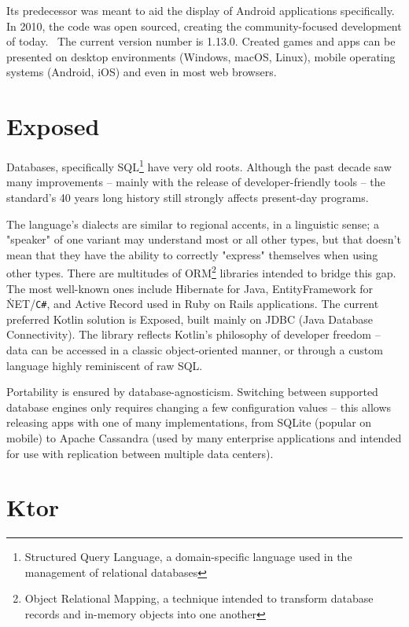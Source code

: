 Its predecessor was meant to aid the display of Android applications specifically. In 2010, the code was open sourced, creating the community-focused development of today.~\cite{LibgdxHistory} The current version number is 1.13.0. Created games and apps can be presented on desktop environments (Windows, macOS, Linux), mobile operating systems (Android, iOS) and even in most web browsers.

\section{Exposed}

Databases, specifically SQL\footnote{Structured Query Language, a domain-specific language used in the management of relational databases} have very old roots. Although the past decade saw many improvements -- mainly with the release of developer-friendly tools -- the standard's 40 years long history still strongly affects present-day programs.


The language's dialects are similar to regional accents, in a linguistic sense; a "speaker" of one variant may understand most or all other types, but that doesn't mean that they have the ability to correctly "express" themselves when using other types. There are multitudes of ORM\footnote{Object Relational Mapping, a technique intended to transform database records and in-memory objects into one another} libraries intended to bridge this gap. The most well-known ones include Hibernate for Java, EntityFramework for \.NET/\texttt{C\#}, and Active Record used in Ruby on Rails applications. The current preferred Kotlin solution is Exposed, built mainly on JDBC (Java Database Connectivity). The library reflects Kotlin's philosophy of developer freedom -- data can be accessed in a classic object-oriented manner, or through a custom language highly reminiscent of raw SQL.~\cite{ExposedDocs}


Portability is ensured by database-agnosticism. Switching between supported database engines only requires changing a few configuration values -- this allows releasing apps with one of many implementations, from SQLite (popular on mobile) to Apache Cassandra (used by many enterprise applications and intended for use with replication between multiple data centers).

\section{Ktor}

